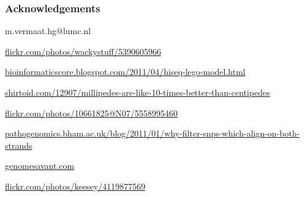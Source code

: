 \documentclass[slidestop,14pt]{beamer}
\begin{document}
\begin{frame}
  \frametitle{Acknowledgements}

  \vspace{\baselineskip}

  {\scriptsize
    m.vermaat.hg@lumc.nl

    \vspace{1.5\baselineskip}

    \href{http://www.flickr.com/photos/wackystuff/5390605966/in/photostream/}{flickr.com/photos/wackystuff/5390605966}

    \vspace{0.5\baselineskip}

    \href{http://bioinformaticscore.blogspot.com/2011/04/hiseq-lego-model.html}{bioinformaticscore.blogspot.com/2011/04/hiseq-lego-model.html}

    \vspace{0.5\baselineskip}

    \href{http://shirtoid.com/12907/millipedes-are-like-10-times-better-than-centipedes/}{shirtoid.com/12907/millipedes-are-like-10-times-better-than-centipedes}

    \vspace{0.5\baselineskip}

    \href{http://www.flickr.com/photos/10661825@N07/5558995460/}{flickr.com/photos/10661825@N07/5558995460}

    \vspace{0.5\baselineskip}

    \href{http://pathogenomics.bham.ac.uk/blog/2011/01/why-filter-snps-which-align-on-both-strands/}{pathogenomics.bham.ac.uk/blog/2011/01/why-filter-snps-which-align-on-both-strands}

    \vspace{0.5\baselineskip}

    \href{http://genomesavant.com/}{genomesavant.com}

    \vspace{0.5\baselineskip}

    \href{http://www.flickr.com/photos/keesey/4119877569/in/photostream/}{flickr.com/photos/keesey/4119877569}

  }
\end{frame}
\end{document}
